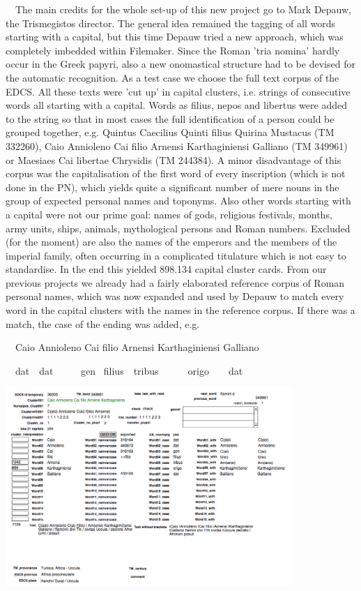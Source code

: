 \documentclass[amsthm,ebook]{saparticle}
\begin{document}
\ \ The main credits for the whole set-up of this new project go to Mark Depauw, the Trismegistos director. The general
idea remained the tagging of all words starting with a capital, but this time Depauw tried a new approach, which was
completely imbedded within Filemaker. Since the Roman 'tria nomina' hardly occur in the Greek papyri, also a new
onomastical structure had to be devised for the automatic recognition. As a test case we choose the full text corpus of
the EDCS. All these texts were 'cut up' in capital clusters, i.e. strings of consecutive words all starting with a
capital. Words as filius, nepos and libertus were added to the string so that in most cases the full identification of
a person could be grouped together, e.g. Quintus Caecilius Quinti filius Quirina Mustacus (TM 332260), Caio Annioleno
Cai filio Arnensi Karthaginiensi Galliano (TM 349961) or Maesiaes Cai libertae Chrysidis (TM 244384). A minor
disadvantage of this corpus was the capitalisation of the first word of every inscription (which is not done in the
PN), which yields quite a significant number of mere nouns in the group of expected personal names and toponyms. Also
other words starting with a capital were not our prime goal: names of gods, religious festivals, months, army units,
ships, animals, mythological persons and Roman numbers. Excluded (for the moment) are also the names of the emperors
and the members of the imperial family, often occurring in a complicated titulature which is not easy to standardise.
In the end this yielded 898.134 capital cluster cards. From our previous projects we already had a fairly elaborated
reference corpus of Roman personal names, which was now expanded and used by Depauw to match every word in the capital
clusters with the names in the reference corpus. If there was a match, the case of the ending was added, e.g.

\ \ Caio Annioleno Cai filio Arnensi Karthaginiensi Galliano

\ \ dat\ \ dat \ \ \ \ \ gen \ filius\ \ tribus\ \  \ \ \ \ origo\ \ \ \ dat


\bigskip

 \includegraphics[width=10.881cm,height=7.505cm]{EAGLE2016FullPaperVerreth-img001.png} 
\end{document}
